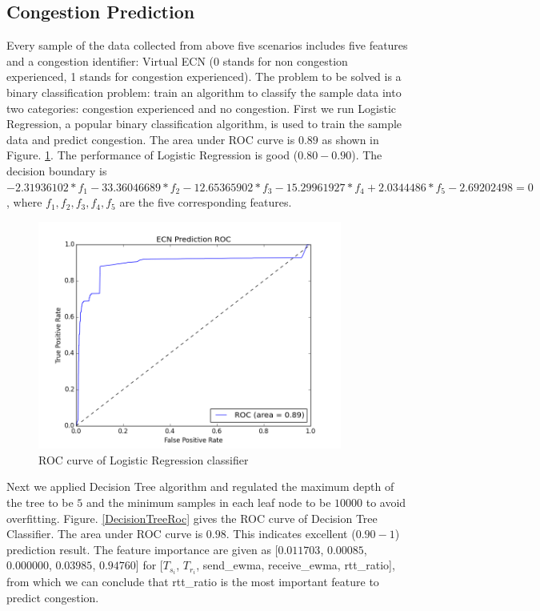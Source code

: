 \subsection{Congestion Prediction}
\label{CongestionPredict}
\par Every sample of the data collected from above five scenarios includes five features and a congestion identifier: Virtual ECN (0 stands for non congestion experienced, 1 stands for congestion experienced). The problem to be solved is a binary classification problem: train an algorithm to classify the sample data into two categories: congestion experienced and no congestion. First we run Logistic Regression, a popular binary classification algorithm, is used to train the sample data and predict congestion. The area under ROC curve is $0.89$ as shown in Figure. \ref{LRRoc}. The performance of Logistic Regression is good ($0.80 - 0.90$). The decision boundary is $ -2.31936102*f_{1} - 33.36046689*f_{2} - 12.65365902*f_{3} - 15.29961927*f_{4} + 2.0344486*f_{5} - 2.69202498 = 0$, where $f_{1}, f_{2}, f_{3}, f_{4}, f_{5}$ are the five corresponding features.
\begin{figure}
\centering
\includegraphics[width=10cm]{LRRoc.png}
\caption{ROC curve of Logistic Regression classifier}
\label{LRRoc}
\end{figure}




\par Next we applied Decision Tree algorithm and regulated the maximum depth of the tree to be $5$ and the minimum samples in each leaf node to be $10000$ to avoid overfitting. Figure. \ref{DecisionTreeRoc} gives the ROC curve of Decision Tree Classifier. The area under ROC curve is $0.98$. This indicates excellent ($0.90 - 1$) prediction result. The feature importance are given as [$0.011703$, $0.00085$, $0.000000$, $0.03985$, $0.94760$] for [$T_{s_{i}}$, $T_{r_{i}}$, send\_ewma, receive\_ewma, rtt\_ratio], from which we can conclude that rtt\_ratio is the most important feature to predict congestion. 

